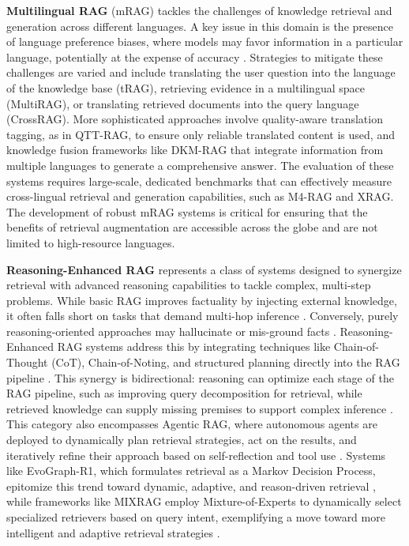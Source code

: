 \documentclass[11pt]{article}
\begin{document}
\textbf{Multilingual RAG} (mRAG) tackles the challenges of knowledge retrieval and generation across different languages. A key issue in this domain is the presence of language preference biases, where models may favor information in a particular language, potentially at the expense of accuracy \cite{ref52}. Strategies to mitigate these challenges are varied and include translating the user question into the language of the knowledge base (tRAG), retrieving evidence in a multilingual space (MultiRAG), or translating retrieved documents into the query language (CrossRAG). More sophisticated approaches involve quality-aware translation tagging, as in QTT-RAG, to ensure only reliable translated content is used, and knowledge fusion frameworks like DKM-RAG that integrate information from multiple languages to generate a comprehensive answer. The evaluation of these systems requires large-scale, dedicated benchmarks that can effectively measure cross-lingual retrieval and generation capabilities, such as M4-RAG and XRAG. The development of robust mRAG systems is critical for ensuring that the benefits of retrieval augmentation are accessible across the globe and are not limited to high-resource languages.

\textbf{Reasoning-Enhanced RAG} represents a class of systems designed to synergize retrieval with advanced reasoning capabilities to tackle complex, multi-step problems. While basic RAG improves factuality by injecting external knowledge, it often falls short on tasks that demand multi-hop inference \cite{ref21}. Conversely, purely reasoning-oriented approaches may hallucinate or mis-ground facts \cite{ref21}. Reasoning-Enhanced RAG systems address this by integrating techniques like Chain-of-Thought (CoT), Chain-of-Noting, and structured planning directly into the RAG pipeline \cite{ref53,ref21}. This synergy is bidirectional: reasoning can optimize each stage of the RAG pipeline, such as improving query decomposition for retrieval, while retrieved knowledge can supply missing premises to support complex inference \cite{ref53}. This category also encompasses Agentic RAG, where autonomous agents are deployed to dynamically plan retrieval strategies, act on the results, and iteratively refine their approach based on self-reflection and tool use \cite{ref28,ref21}. Systems like EvoGraph-R1, which formulates retrieval as a Markov Decision Process, epitomize this trend toward dynamic, adaptive, and reason-driven retrieval \cite{ref42}, while frameworks like MIXRAG employ Mixture-of-Experts to dynamically select specialized retrievers based on query intent, exemplifying a move toward more intelligent and adaptive retrieval strategies \cite{ref54}.
\end{document}

